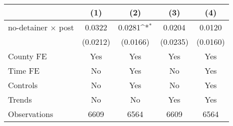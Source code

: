 {
\def\sym#1{\ifmmode^{#1}\else\(^{#1}\)\fi}
\begin{tabular*}{0.7\textwidth}{@{\hskip\tabcolsep\extracolsep\fill}l*{4}{c}}
\hline\hline
                    &\multicolumn{1}{c}{(1)}         &\multicolumn{1}{c}{(2)}         &\multicolumn{1}{c}{(3)}         &\multicolumn{1}{c}{(4)}         \\
\hline
no-detainer $\times$ post&      0.0322         &      0.0281\sym{*}  &      0.0204         &      0.0120         \\
                    &    (0.0212)         &    (0.0166)         &    (0.0235)         &    (0.0160)         \\
[1em]
County FE           &         Yes         &         Yes         &         Yes         &         Yes         \\
[1em]
Time FE             &          No         &         Yes         &          No         &         Yes         \\
[1em]
Controls            &          No         &         Yes         &          No         &         Yes         \\
[1em]
Trends              &          No         &          No         &         Yes         &         Yes         \\
\hline
Observations        &        6609         &        6564         &        6609         &        6564         \\
\hline\hline
\end{tabular*}
}
